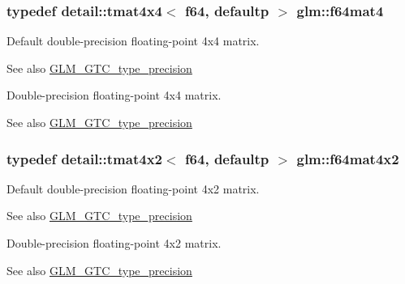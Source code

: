 \subsubsection[{\texorpdfstring{f64mat4}{f64mat4}}]{\setlength{\rightskip}{0pt plus 5cm}typedef detail\+::tmat4x4$<$ f64, defaultp $>$ {\bf glm\+::f64mat4}}\hypertarget{group__gtc__type__precision_ga1e2d73ea989e6a5abd90cbe9f1025a41}{}\label{group__gtc__type__precision_ga1e2d73ea989e6a5abd90cbe9f1025a41}
Default double-\/precision floating-\/point 4x4 matrix. \begin{DoxySeeAlso}{See also}
\hyperlink{group__gtc__type__precision}{G\+L\+M\+\_\+\+G\+T\+C\+\_\+type\+\_\+precision}
\end{DoxySeeAlso}
Double-\/precision floating-\/point 4x4 matrix. \begin{DoxySeeAlso}{See also}
\hyperlink{group__gtc__type__precision}{G\+L\+M\+\_\+\+G\+T\+C\+\_\+type\+\_\+precision} 
\end{DoxySeeAlso}
\subsubsection[{\texorpdfstring{f64mat4x2}{f64mat4x2}}]{\setlength{\rightskip}{0pt plus 5cm}typedef detail\+::tmat4x2$<$ f64, defaultp $>$ {\bf glm\+::f64mat4x2}}\hypertarget{group__gtc__type__precision_gae716a8717cc6af191aec562d93ff6299}{}\label{group__gtc__type__precision_gae716a8717cc6af191aec562d93ff6299}
Default double-\/precision floating-\/point 4x2 matrix. \begin{DoxySeeAlso}{See also}
\hyperlink{group__gtc__type__precision}{G\+L\+M\+\_\+\+G\+T\+C\+\_\+type\+\_\+precision}
\end{DoxySeeAlso}
Double-\/precision floating-\/point 4x2 matrix. \begin{DoxySeeAlso}{See also}
\hyperlink{group__gtc__type__precision}{G\+L\+M\+\_\+\+G\+T\+C\+\_\+type\+\_\+precision} 
\end{DoxySeeAlso}
